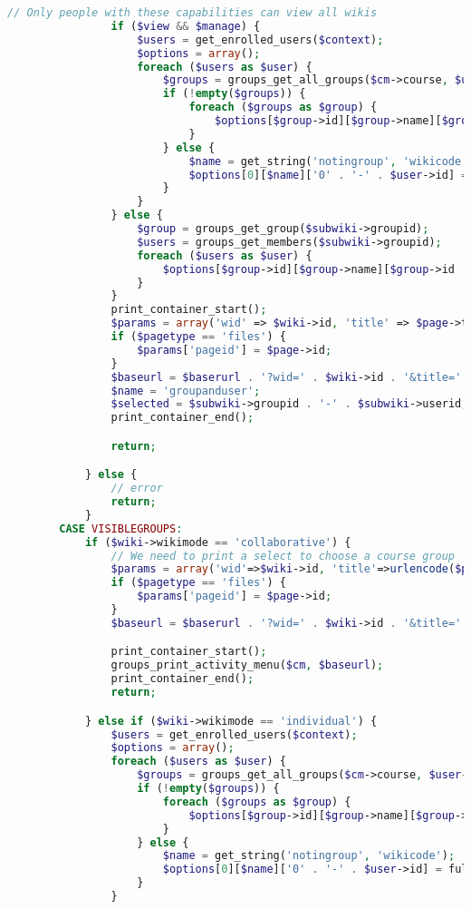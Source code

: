 \begin{lstlisting}[language=PHP]
                // Only people with these capabilities can view all wikis
                if ($view && $manage) {
                    $users = get_enrolled_users($context);
                    $options = array();
                    foreach ($users as $user) {
                        $groups = groups_get_all_groups($cm->course, $user->id);
                        if (!empty($groups)) {
                            foreach ($groups as $group) {
                                $options[$group->id][$group->name][$group->id . '-' . $user->id] = fullname($user);
                            }
                        } else {
                            $name = get_string('notingroup', 'wikicode');
                            $options[0][$name]['0' . '-' . $user->id] = fullname($user);
                        }
                    }
                } else {
                    $group = groups_get_group($subwiki->groupid);
                    $users = groups_get_members($subwiki->groupid);
                    foreach ($users as $user) {
                        $options[$group->id][$group->name][$group->id . '-' . $user->id] = fullname($user);
                    }
                }
                print_container_start();
                $params = array('wid' => $wiki->id, 'title' => $page->title);
                if ($pagetype == 'files') {
                    $params['pageid'] = $page->id;
                }
                $baseurl = $baserurl . '?wid=' . $wiki->id . '&title=' . $page->title;
                $name = 'groupanduser';
                $selected = $subwiki->groupid . '-' . $subwiki->userid;
                print_container_end();

                return;

            } else {
                // error
                return;
            }
        CASE VISIBLEGROUPS:
            if ($wiki->wikimode == 'collaborative') {
                // We need to print a select to choose a course group
                $params = array('wid'=>$wiki->id, 'title'=>urlencode($page->title));
                if ($pagetype == 'files') {
                    $params['pageid'] = $page->id;
                }
                $baseurl = $baserurl . '?wid=' . $wiki->id . '&title=' . $page->title;

                print_container_start();
                groups_print_activity_menu($cm, $baseurl);
                print_container_end();
                return;

            } else if ($wiki->wikimode == 'individual') {
                $users = get_enrolled_users($context);
                $options = array();
                foreach ($users as $user) {
                    $groups = groups_get_all_groups($cm->course, $user->id);
                    if (!empty($groups)) {
                        foreach ($groups as $group) {
                            $options[$group->id][$group->name][$group->id . '-' . $user->id] = fullname($user);
                        }
                    } else {
                        $name = get_string('notingroup', 'wikicode');
                        $options[0][$name]['0' . '-' . $user->id] = fullname($user);
                    }
                }


\end{lstlisting}
